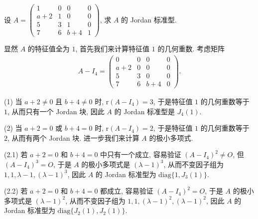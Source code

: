 \documentclass[../../main.tex]{subfiles}%
\begin{document}
\begin{example}
设 $A = \begin{pmatrix}
1 & 0 & 0 & 0 \\
a + 2 & 1 & 0 & 0 \\
5 & 3 & 1 & 0 \\
7 & 6 & b + 4 & 1
\end{pmatrix}$, 求 $A$ 的 Jordan 标准型.
\end{example}
\begin{solution}

显然 $A$ 的特征值全为 $1$, 首先我们来计算特征值 $1$ 的几何重数. 考虑矩阵
\begin{align*}
A - I_4 = \begin{pmatrix}
0 & 0 & 0 & 0 \\
a + 2 & 0 & 0 & 0 \\
5 & 3 & 0 & 0 \\
7 & 6 & b + 4 & 0
\end{pmatrix}.
\end{align*}

(1) 当 $a + 2 \neq 0$ 且 $b + 4 \neq 0$ 时, $\mathrm{r}(A - I_4) = 3$, 于是特征值 $1$ 的几何重数等于 $1$, 从而只有一个 Jordan 块, 因此 $A$ 的 Jordan 标准型是 $J_4(1)$.

(2) 当 $a + 2 = 0$ 或 $b + 4 = 0$ 时, $\mathrm{r}(A - I_4) = 2$, 于是特征值 $1$ 的几何重数等于 $2$, 从而有两个 Jordan 块. 进一步我们来计算 $A$ 的极小多项式.

(2.1) 若 $a + 2 = 0$ 和 $b + 4 = 0$ 中只有一个成立, 容易验证 $(A - I_4)^2 \neq O$, 但 $(A - I_4)^3 = O$, 于是 $A$ 的极小多项式是 $(\lambda - 1)^3$, 从而不变因子组为 $1,1,\lambda - 1,(\lambda - 1)^3$, 因此 $A$ 的 Jordan 标准型为 $\mathrm{diag}\{1,J_3(1)\}$.

(2.2) 若 $a + 2 = 0$ 和 $b + 4 = 0$ 都成立, 容易验证 $(A - I_4)^2 = O$, 于是 $A$ 的极小多项式是 $(\lambda - 1)^2$, 从而不变因子组为 $1,1,(\lambda - 1)^2,(\lambda - 1)^2$, 因此 $A$ 的 Jordan 标准型为 $\mathrm{diag}\{J_2(1),J_2(1)\}$. 

\end{solution}
\end{document}
